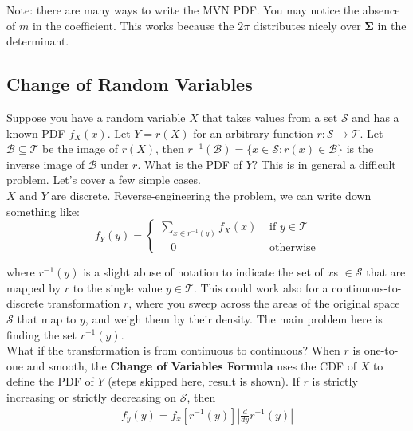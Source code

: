 \documentclass{harvardml}
\theoremstyle{definition}
\theoremstyle{plain}
\renewcommand{\v}[1]{\mathbf{#1}}
\begin{document}
		\noindent Note: there are many ways to write the MVN PDF. 
		You may notice the absence of $m$ in the coefficient. 
		This works because the $2\pi$ distributes nicely over 
		$\v \Sigma$ in the determinant.

\newpage

	\subsection{Change of Random Variables}

		Suppose you have a random variable $X$ that takes values from a set
		$\mathcal{S}$ and has a known PDF $f_X(x)$. Let $Y = r(X)$ for an 
		arbitrary function $r : \mathcal{S} \rightarrow \mathcal{T}$. 
		Let $\mathcal{B} \subseteq \mathcal{T}$ be the image of $r(X)$,
		then $r^{-1}(\mathcal{B}) = \{x \in \mathcal{S} : r(x) \in 
		\mathcal{B} \}$ is the inverse image of $\mathcal{B}$ under $r$. 
		What is the PDF of $Y$? This is in general a difficult problem.
		Let's cover a few simple cases.\\

		\noindent $X$ and $Y$ are discrete. Reverse-engineering 
		the problem, we can write down something like:
		\[
			f_Y(y) = 
			\begin{cases}
				\displaystyle \sum_{x \in r^{-1}(y)} 
				f_X(x) &\text{ if } y \in \mathcal{T}\\
				\quad 0 & \text{ otherwise}
			\end{cases}
		\]

		\noindent where $r^{-1}(y)$ is a slight abuse of notation
		to indicate the set of $x$s $\in \mathcal{S}$ that are  mapped by
		$r$ to the single value $y \in \mathcal{T}$. This could work also
		for a continuous-to-discrete transformation $r$, where you sweep across
		the areas of the original space $\mathcal{S}$ that map to $y$, and weigh
		them by their density. The main problem here is finding the set 
		$r^{-1}(y)$.\\

		\noindent What if the transformation is from continuous to continuous?
		When $r$ is one-to-one and smooth, the \textbf{Change of Variables 
		Formula} uses the CDF of $X$ to define the PDF of $Y$ (steps skipped 
		here, result is shown). If $r$ is strictly increasing or strictly 
		decreasing on $\mathcal{S}$, then
		\begin{align*}
			f_y(y) = f_x[r^{-1}(y)]|\frac{d}{dy}r^{-1}(y)|
		\end{align*}
\end{document}
